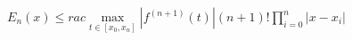 \documentclass[preview]{standalone}
\begin{document}
\begin{align*}
E_n(x) \leq  rac{\max_{t \in [x_0, x_n]} |f^{(n+1)}(t)|}{(n+1)!}  \prod_{i=0}^{n} |x - x_i|
\end{align*}
\end{document}
